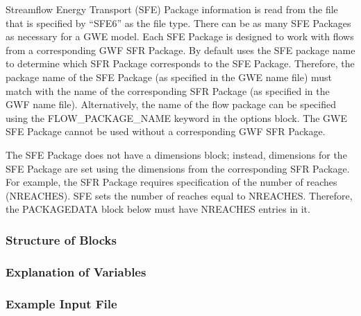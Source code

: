 Streamflow Energy Transport (SFE) Package information is read from the file that is specified by ``SFE6'' as the file type.  There can be as many SFE Packages as necessary for a GWE model. Each SFE Package is designed to work with flows from a corresponding GWF SFR Package. By default \mf uses the SFE package name to determine which SFR Package corresponds to the SFE Package.  Therefore, the package name of the SFE Package (as specified in the GWE name file) must match with the name of the corresponding SFR Package (as specified in the GWF name file).  Alternatively, the name of the flow package can be specified using the FLOW\_PACKAGE\_NAME keyword in the options block.  The GWE SFE Package cannot be used without a corresponding GWF SFR Package.

The SFE Package does not have a dimensions block; instead, dimensions for the SFE Package are set using the dimensions from the corresponding SFR Package.  For example, the SFR Package requires specification of the number of reaches (NREACHES).  SFE sets the number of reaches equal to NREACHES.  Therefore, the PACKAGEDATA block below must have NREACHES entries in it.

\vspace{5mm}
\subsubsection{Structure of Blocks}




\vspace{5mm}
\subsubsection{Explanation of Variables}
\begin{description}

\end{description}

\vspace{5mm}
\subsubsection{Example Input File}


\vspace{5mm}
